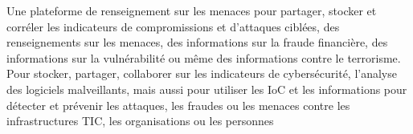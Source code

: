 Une plateforme de renseignement sur les menaces pour partager, stocker et corréler les indicateurs de compromissions et d'attaques ciblées, des renseignements sur les menaces, des informations sur la fraude financière, des informations sur la vulnérabilité ou même des informations contre le terrorisme.  Pour stocker, partager, collaborer sur les indicateurs de cybersécurité, l'analyse des logiciels malveillants, mais aussi pour utiliser les IoC et les informations pour détecter et prévenir les attaques, les fraudes ou les menaces contre les infrastructures TIC, les organisations ou les personnes